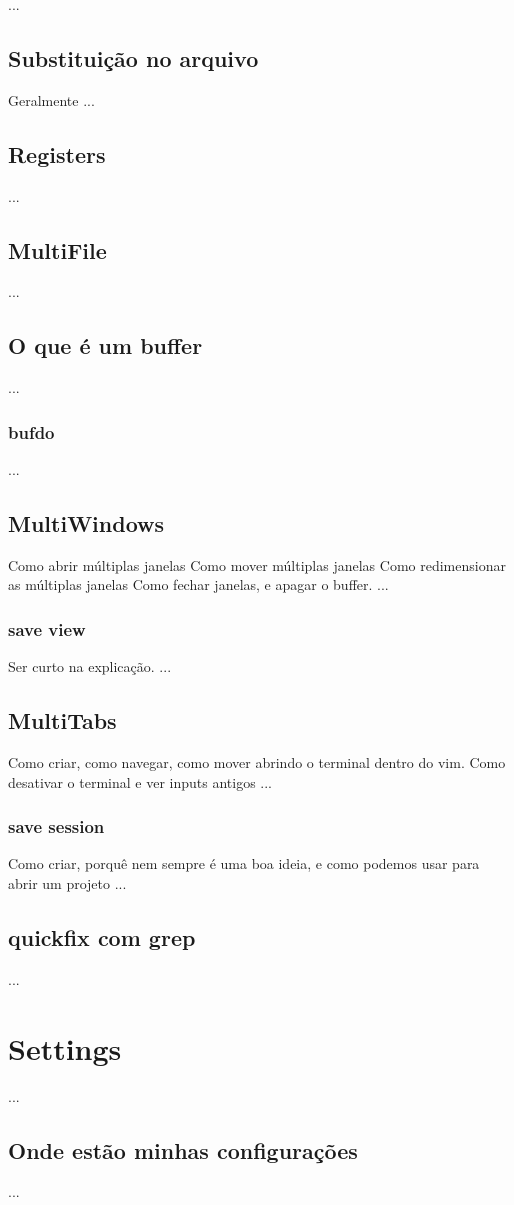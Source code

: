 \documentclass[a4paper, 12pt]{article}
\begin{document}
...
\subsection{Substituição no arquivo}
Geralmente
...
\subsection{Registers}
...
\subsection{MultiFile}
...
\subsection{O que é um buffer}
...
\subsubsection{bufdo}
...
\subsection{MultiWindows}
Como abrir múltiplas janelas
Como mover múltiplas janelas
Como redimensionar as múltiplas janelas
Como fechar janelas, e apagar o buffer.
...
\subsubsection{save view}
Ser curto na explicação.
...
\subsection{MultiTabs}
Como criar, como navegar, como mover
abrindo o terminal dentro do vim. Como desativar o terminal e ver inputs antigos
...
\subsubsection{save session}
Como criar, porquê nem sempre é uma boa ideia, e como podemos usar para abrir um projeto
...
\subsection{quickfix com grep}
...
\newpage
\section{Settings}
...
\subsection{Onde estão minhas configurações}
...
\end{document}
